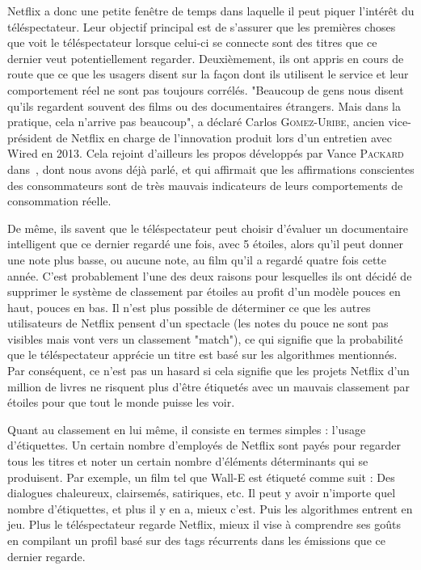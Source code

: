 \documentclass[a4paper,14pt]{extreport}
\begin{document}
Netflix a donc une petite fenêtre de temps dans laquelle il peut piquer l’intérêt du téléspectateur. Leur objectif principal est de s'assurer que les premières choses que voit le téléspectateur lorsque celui-ci se connecte sont des titres que ce dernier veut potentiellement regarder. Deuxièmement, ils ont appris en cours de route que ce que les usagers disent sur la façon dont ils utilisent le service et leur comportement réel ne sont pas toujours corrélés. "Beaucoup de gens nous disent qu'ils regardent souvent des films ou des documentaires étrangers. Mais dans la pratique, cela n'arrive pas beaucoup", a déclaré Carlos \textsc{Gomez-Uribe}, ancien vice-président de Netflix en charge de l'innovation produit lors d'un entretien avec Wired en 2013. Cela rejoint d'ailleurs les propos développés par Vance \textsc{Packard} dans~\cite{packard}, dont nous avons déjà parlé, et qui affirmait que les affirmations conscientes des consommateurs sont de très mauvais indicateurs de leurs comportements de consommation réelle.

De même, ils savent que le téléspectateur peut choisir d'évaluer un documentaire intelligent que ce dernier regardé une fois, avec 5 étoiles, alors qu’il peut donner une note plus basse, ou aucune note, au film qu’il a regardé quatre fois cette année. C'est probablement l'une des deux raisons pour lesquelles ils ont décidé de supprimer le système de classement par étoiles au profit d'un modèle pouces en haut, pouces en bas. Il n'est plus possible de déterminer ce que les autres utilisateurs de Netflix pensent d'un spectacle (les notes du pouce ne sont pas visibles mais vont vers un classement "match"), ce qui signifie que la probabilité que le téléspectateur apprécie un titre est basé sur les algorithmes mentionnés. Par conséquent, ce n'est pas un hasard si cela signifie que les projets Netflix d'un million de livres ne risquent plus d'être étiquetés avec un mauvais classement par étoiles pour que tout le monde puisse les voir.

Quant au classement en lui même, il consiste en termes simples : l’usage d’étiquettes. Un certain nombre d'employés de Netflix sont payés pour regarder tous les titres et noter un certain nombre d'éléments déterminants qui se produisent. Par exemple, un film tel que Wall-E est étiqueté comme suit : Des dialogues chaleureux, clairsemés, satiriques, etc. Il peut y avoir n'importe quel nombre d'étiquettes, et plus il y en a, mieux c'est. Puis les algorithmes entrent en jeu. Plus le téléspectateur regarde Netflix, mieux il vise à comprendre ses goûts en compilant un profil basé sur des tags récurrents dans les émissions que ce dernier regarde.
\end{document}
